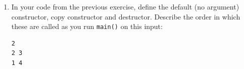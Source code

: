 \documentclass[a4paper,12pt]{article}
\begin{document}
\begin{enumerate}
{\bf Sample input}

\begin{Verbatim}[frame=single]
5
4 17
4 17
5 1000
7 12
7 9
\end{Verbatim}

{\bf Sample output}

\begin{Verbatim}[frame=single]
4 17
5 1000
7 12
\end{Verbatim}



\item 
In your code from the previous exercise, define the default (no argument) constructor, copy constructor 
and destructor. Describe the order in which these are called as you run {\tt main()} on this input:

\begin{Verbatim}[frame=single]
2
2 3
1 4
\end{Verbatim}



\end{enumerate}
\end{document}
